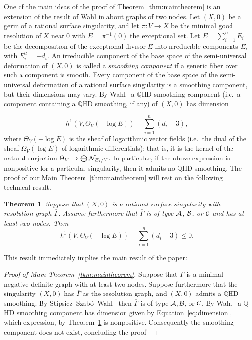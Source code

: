 \documentclass[a4paper, reqno, twoside]{amsart}
\newtheorem{theorem}{Theorem}[section]
\theoremstyle{definition}
\numberwithin{equation}{section}
\begin{document}
One of the main ideas of the proof of Theorem~\ref{thm:maintheorem} is an
extension of the result of Wahl in \cite[\S8]{Wahl-2011} about graphs
of two nodes. Let $(X, 0)$ be a germ of a rational surface
singularity, and let $\pi\colon V \to X$ be the minimal good
resolution of $X$ near $0$ with $E=\pi^{-1}(0)$ the exceptional
set. Let $E=\sum_{i=1}^{n} E_i$ be the decomposition of the
exceptional divisor $E$ into irreducible components $E_i$ with
$E_i^2=-d_i$. An irreducible component of the base space of the
semi-universal deformation of $(X,0)$ is called a \emph{smoothing
  component} if a generic fiber over such a component is smooth. Every
component of the base space of the semi-universal deformation of a
rational surface singularity is a smoothing component, but their
dimensions may vary. By Wahl~\cite[Theorem~8.1]{Wahl-2011} a {$\mathbb{Q}$HD smoothing\xspace}
component (i.e.\  a component containing a {$\mathbb{Q}$HD smoothing\xspace}, if any) of $(X,0)$ has
dimension

\begin{equation}\label{eq:dimension}
h^1(V, \Theta_V(-\log{E}))+\sum_{i=1}^{n}{(d_i-3)},
\end{equation}
where $\Theta_V(-\log{E})$ is the sheaf of logarithmic vector fields (i.e.\  the dual of the sheaf $\Omega_V(\log{E})$ of logarithmic differentials); that is, it is the kernel of the natural surjection $\Theta_V \to \bigoplus {\ensuremath \mathcal{N}}_{E_i/V}$. In particular, if the above expression is nonpositive
for a particular singularity, then it admits no {$\mathbb{Q}$HD smoothing\xspace}.
The proof of our Main Theorem~\ref{thm:maintheorem} will rest on the
following technical result.

\begin{theorem}\label{thm:nonexist}
Suppose that $(X,0)$ is a rational surface singularity with resolution
graph $\overline{\Gamma}$. Assume furthermore that $\overline{\Gamma}$
is of type ${\ensuremath \mathcal{A}}$, ${\ensuremath \mathcal{B}}$, or ${\ensuremath \mathcal{C}}$ and has at least two nodes. Then
\begin{equation}\label{equation:h1+(d-3)}
h^1(V, \Theta_V(-\log{E}))+\sum_{i=1}^{n}{(d_i-3)} \le 0.
\end{equation}
\end{theorem}
This result immediately implies the main result of the paper:

\begin{proof}[Proof of Main Theorem~\ref{thm:maintheorem}]
Suppose that $\overline{\Gamma}$ is a minimal negative definite graph with
at least two nodes. Suppose furthermore that the singularity $(X,0)$ has
$\overline{\Gamma}$ as the resolution graph, and $(X, 0)$ admits a
{$\mathbb{Q}$HD smoothing\xspace}. By
Stipsicz--Szab\'o--Wahl~\cite{Stipsicz-Szabo-Wahl-2008} then
$\overline{\Gamma}$ is of type ${\ensuremath \mathcal{A}}, {\ensuremath \mathcal{B}}$, or ${\ensuremath \mathcal{C}}$. By
Wahl~\cite[Theorem~8.1]{Wahl-2011} a {$\mathbb{Q}$HD smoothing\xspace} component has
dimension given by Equation~\eqref{eq:dimension}, which expression, by
Theorem~\ref{thm:nonexist} is nonpositive. Consequently the smoothing
component does not exist, concluding the proof.
\end{proof}
\end{document}
